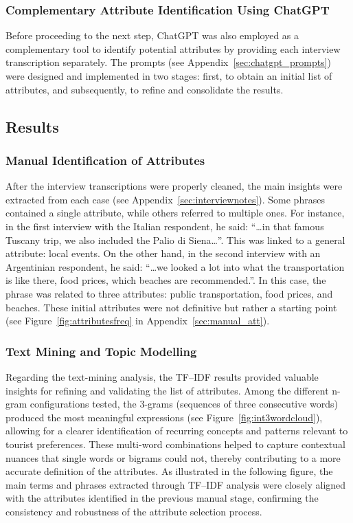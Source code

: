 \documentclass[a4paper, 12pt, twoside]{report}  %
\begin{document}
\subsubsection{Complementary Attribute Identification Using ChatGPT}

\indent Before proceeding to the next step, ChatGPT was also employed as a complementary tool to identify potential attributes by providing each interview transcription separately. The prompts (see Appendix~\ref{sec:chatgpt_prompts}) were designed and implemented in two stages: first, to obtain an initial list of attributes, and subsequently, to refine and consolidate the results.

\subsection{Results}

\subsubsection{Manual Identification of Attributes}

\indent After the interview transcriptions were properly cleaned, the main insights were extracted from each case (see Appendix~\ref{sec:interviewnotes}). Some phrases contained a single attribute, while others referred to multiple ones. For instance, in the first interview with the Italian respondent, he said: “…in that famous Tuscany trip, we also included the Palio di Siena…”. This was linked to a general attribute: local events. On the other hand, in the second interview with an Argentinian respondent, he said: “…we looked a lot into what the transportation is like there, food prices, which beaches are recommended.”. In this case, the phrase was related to three attributes: public transportation, food prices, and beaches. These initial attributes were not definitive but rather a starting point (see Figure~\ref{fig:attributesfreq} in Appendix~\ref{sec:manual_att}).

\subsubsection{Text Mining and Topic Modelling}

\indent Regarding the text-mining analysis, the TF–IDF results provided valuable insights for refining and validating the list of attributes. Among the different n-gram configurations tested, the 3-grams (sequences of three consecutive words) produced the most meaningful expressions (see Figure~\ref{fig:int3wordcloud}), allowing for a clearer identification of recurring concepts and patterns relevant to tourist preferences. These multi-word combinations helped to capture contextual nuances that single words or bigrams could not, thereby contributing to a more accurate definition of the attributes. As illustrated in the following figure, the main terms and phrases extracted through TF–IDF analysis were closely aligned with the attributes identified in the previous manual stage, confirming the consistency and robustness of the attribute selection process.
\end{document}
